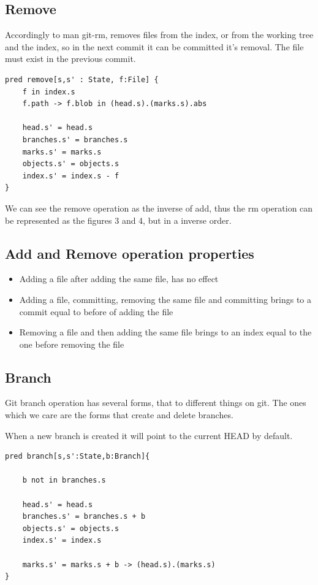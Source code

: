 \pagebreak

\subsection{Remove}

Accordingly to man git-rm, removes files from the index, or from the
working tree and the index, so in the next commit it can be committed
it's removal. The file must exist in the previous commit.\par

\begin{lstlisting}
pred remove[s,s' : State, f:File] {
	f in index.s
	f.path -> f.blob in (head.s).(marks.s).abs

	head.s' = head.s
	branches.s' = branches.s
	marks.s' = marks.s 
	objects.s' = objects.s
	index.s' = index.s - f
}
\end{lstlisting}

We can see the remove operation as the inverse of add, thus the rm 
operation can be represented as the figures 3 and 4, but in a inverse
order. \par


\subsection{Add and Remove operation properties}


\begin{itemize}
	\item Adding a file after adding the same file, has no effect
	\item Adding a file, committing, removing the same file and 
	committing brings to a commit equal to before of adding the file
	\item Removing a file and then adding the same file brings to an
	index equal to the one before removing the file
\end{itemize}

\subsection{Branch}

Git branch operation has several forms, that to different things on git.
The ones which we care are the forms that create and delete branches. \par
When a new branch is created it will point to the current HEAD by default.
\par

\begin{lstlisting}
pred branch[s,s':State,b:Branch]{
	
	b not in branches.s

	head.s' = head.s
	branches.s' = branches.s + b
	objects.s' = objects.s
	index.s' = index.s

	marks.s' = marks.s + b -> (head.s).(marks.s)
}
\end{lstlisting}

